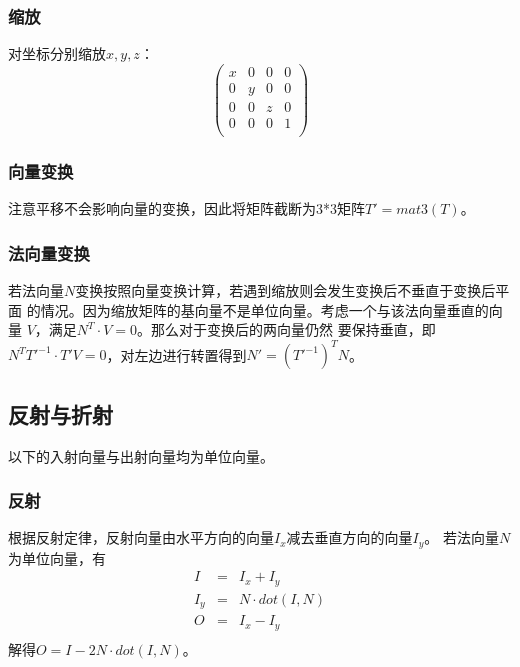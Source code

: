 \subsubsection{缩放}
对坐标分别缩放$x,y,z$：
\begin{displaymath}
    \left(\begin{array}{cccc}
        x & 0 & 0 & 0 \\
        0 & y & 0 & 0 \\
        0 & 0 & z & 0 \\
        0 & 0 & 0 & 1 \\
    \end{array}\right)
\end{displaymath}
\subsubsection{向量变换}
注意平移不会影响向量的变换，因此将矩阵截断为3*3矩阵$T'=mat3(T)$。
\subsubsection{法向量变换}
若法向量$N$变换按照向量变换计算，若遇到缩放则会发生变换后不垂直于变换后平面
的情况。因为缩放矩阵的基向量不是单位向量。考虑一个与该法向量垂直的向量
$V$，满足$N^T\cdot V=0$。那么对于变换后的两向量仍然
要保持垂直，即$N^TT'^{-1} \cdot T'V=0$，对左边进行转置得到$N'=(T'^{-1})^TN$。
\subsection{反射与折射}
以下的入射向量与出射向量均为单位向量。
\subsubsection{反射}
根据反射定律，反射向量由水平方向的向量$I_x$减去垂直方向的向量$I_y$。
若法向量$N$为单位向量，有
\begin{eqnarray*}
    I&=&I_x+I_y\\
    I_y&=&N\cdot dot(I,N)\\
    O&=&I_x-I_y\\
\end{eqnarray*}
解得$O=I-2N\cdot dot(I,N)$。
